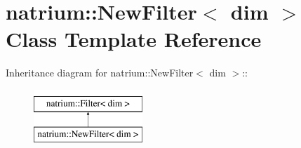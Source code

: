 \hypertarget{classnatrium_1_1NewFilter}{
\section{natrium::NewFilter$<$ dim $>$ Class Template Reference}
\label{classnatrium_1_1NewFilter}
}
Inheritance diagram for natrium::NewFilter$<$ dim $>$::\begin{figure}[H]
\begin{center}
\leavevmode
\includegraphics[height=2cm]{classnatrium_1_1NewFilter}
\end{center}
\end{figure}
